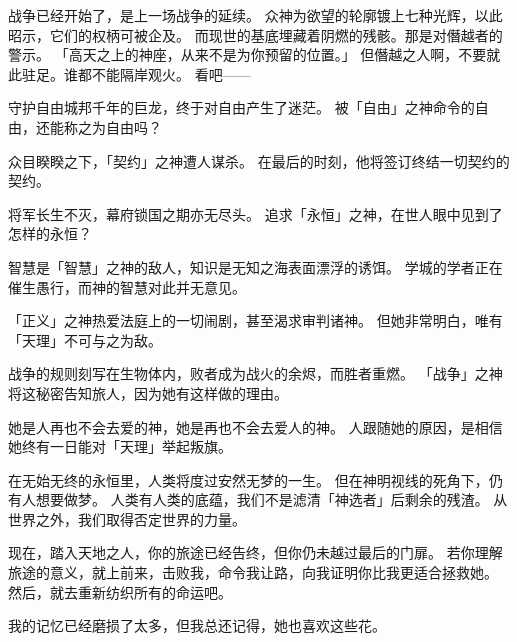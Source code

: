 \documentclass[a4paper,11pt]{article}
\begin{document}
    \pagestyle{plain}
    \rmfamily\normalsize
    \setlength{\parskip}{7pt}
    \setlength{\baselineskip}{15pt}
    \raggedright
    \raggedbottom

    \normalsize

    战争已经开始了，是上一场战争的延续。\linebreak
    众神为欲望的轮廓镀上七种光辉，以此昭示，它们的权柄可被企及。\linebreak
    而现世的基底埋藏着阴燃的残骸。那是对僭越者的警示。\linebreak
    「高天之上的神座，从来不是为你预留的位置。」\linebreak
    但僭越之人啊，不要就此驻足。谁都不能隔岸观火。\linebreak
    看吧——

    守护自由城邦千年的巨龙，终于对自由产生了迷茫。\linebreak
    被「自由」之神命令的自由，还能称之为自由吗？

    众目睽睽之下，「契约」之神遭人谋杀。\linebreak
    在最后的时刻，他将签订终结一切契约的契约。

    将军长生不灭，幕府锁国之期亦无尽头。\linebreak
    追求「永恒」之神，在世人眼中见到了怎样的永恒？

    智慧是「智慧」之神的敌人，知识是无知之海表面漂浮的诱饵。\linebreak
    学城的学者正在催生愚行，而神的智慧对此并无意见。

    「正义」之神热爱法庭上的一切闹剧，甚至渴求审判诸神。\linebreak
    但她非常明白，唯有「天理」不可与之为敌。

    战争的规则刻写在生物体内，败者成为战火的余烬，而胜者重燃。\linebreak
    「战争」之神将这秘密告知旅人，因为她有这样做的理由。

    她是人再也不会去爱的神，她是再也不会去爱人的神。\linebreak
    人跟随她的原因，是相信她终有一日能对「天理」举起叛旗。

    在无始无终的永恒里，人类将度过安然无梦的一生。\linebreak
    但在神明视线的死角下，仍有人想要做梦。\linebreak
    人类有人类的底蕴，我们不是滤清「神选者」后剩余的残渣。\linebreak
    从世界之外，我们取得否定世界的力量。

    现在，踏入天地之人，你的旅途已经告终，但你仍未越过最后的门扉。\linebreak
    若你理解旅途的意义，就上前来，击败我，命令我让路，向我证明你比我更适合拯救她。\linebreak
    然后，就去重新纺织所有的命运吧。

    我的记忆已经磨损了太多，但我总还记得，她也喜欢这些花。


\end{document}
